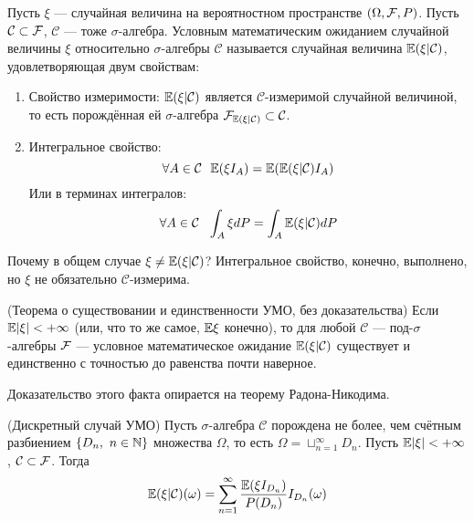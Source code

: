 \begin{definition}
    Пусть $\xi$ --- случайная величина на вероятностном пространстве $(\Omega, \mathcal{F}, P)$. Пусть $\mathcal{C} \subset \mathcal{F}$, $\mathcal{C}$ --- тоже $\sigma$-алгебра. Условным математическим ожиданием случайной величины $\xi$ относительно $\sigma$-алгебры $\mathcal{C}$ называется случайная величина $\mathbb{E}(\xi | \mathcal{C})$, удовлетворяющая двум свойствам:
    \begin{enumerate}
        \item Свойство измеримости: $\mathbb{E}(\xi | \mathcal{C})$ является $\mathcal{C}$-измеримой случайной величиной, то есть порождённая ей $\sigma$-алгебра $\mathcal{F}_{\mathbb{E}(\xi | \mathcal{C})} \subset \mathcal{C}$.

        \item Интегральное свойство:
        \[
            \forall A \in \mathcal{C} \ \ \mathbb{E}(\xi I_A) = \mathbb{E}(\mathbb{E}(\xi | \mathcal{C}) I_A)
        \]
        Или в терминах интегралов:
        \[
            \forall A \in \mathcal{C} \ \ \int_A \xi dP = \int_A \mathbb{E}(\xi | \mathcal{C}) dP
        \]
    \end{enumerate}
\end{definition}

\begin{note}
    Почему в общем случае $\xi \neq \mathbb{E}(\xi | \mathcal{C})$? Интегральное свойство, конечно, выполнено, но $\xi$ не обязательно $\mathcal{C}$-измерима.
\end{note}

\begin{theorem} (Теорема о существовании и единственности УМО, без доказательства)
    Если $\mathbb{E}|\xi| < +\infty$ (или, что то же самое, $\mathbb{E}\xi$ конечно), то для любой $\mathcal{C}$ --- под-$\sigma$-алгебры $\mathcal{F}$ --- условное математическое ожидание $\mathbb{E}(\xi | \mathcal{C})$ существует и единственно с точностью до равенства почти наверное.
\end{theorem}

\begin{note}
    Доказательство этого факта опирается на теорему Радона-Никодима.
\end{note}

\begin{lemma} (Дискретный случай УМО)
    Пусть $\sigma$-алгебра $\mathcal{C}$ порождена не более, чем счётным разбиением $\{D_n,\ n \in \mathbb{N}\}$ множества $\Omega$, то есть $\Omega = \sqcup_{n=1}^{\infty} D_n$. Пусть $\mathbb{E}|\xi| < +\infty$, $\mathcal{C} \subset \mathcal{F}$. Тогда
    \[
        \mathbb{E}(\xi | \mathcal{C})(\omega) = \sum_{n=1}^{\infty} \frac{\mathbb{E}(\xi I_{D_n})}{P(D_n)} I_{D_n}(\omega)
    \]
\end{lemma}

